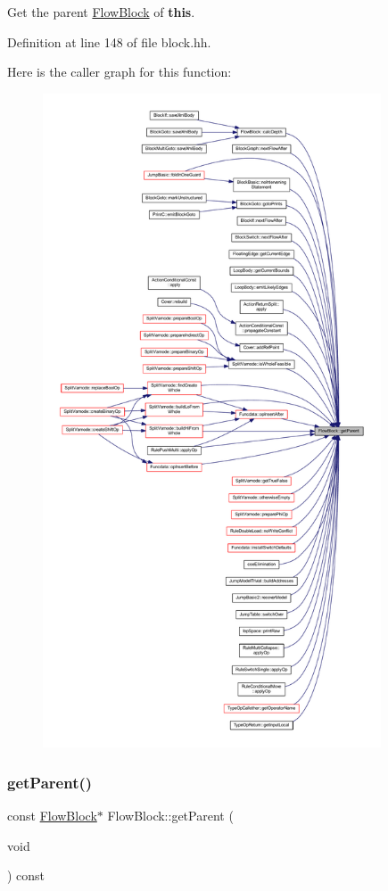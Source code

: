 Get the parent \mbox{\hyperlink{class_flow_block}{Flow\+Block}} of {\bfseries{this}}. 



Definition at line 148 of file block.\+hh.

Here is the caller graph for this function\+:
\nopagebreak
\begin{figure}[H]
\begin{center}
\leavevmode
\includegraphics[height=550pt]{class_flow_block_aa09d7d958c190fa86a30dbe9ac23c78f_icgraph}
\end{center}
\end{figure}
\mbox{\label{class_flow_block_a1b03a3b5ba783d59b979f999686fc98b}} 
\subsubsection{\texorpdfstring{getParent()}{getParent()}\hspace{0.1cm}{\footnotesize\ttfamily [2/2]}}
{\footnotesize\ttfamily const \mbox{\hyperlink{class_flow_block}{Flow\+Block}}$\ast$ Flow\+Block\+::get\+Parent (\begin{DoxyParamCaption}\item[{void}]{ }\end{DoxyParamCaption}) const\hspace{0.3cm}{\ttfamily [inline]}}



